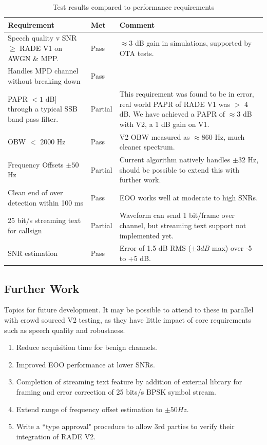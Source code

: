 \documentclass{article}
\begin{document}
\begin{table} [h]
\caption{Test results compared to performance requirements}
\label{tab:conclusion}
\centering
\begin{tabular}{ p{5cm} | p{1cm} | p{5cm}  }
\hline
Requirement & Met & Comment \\
\hline
Speech quality v SNR $\ge$ RADE V1 on AWGN \& MPP. & Pass & $\approx 3$ \si{dB} gain in simulations, supported by OTA tests. \\
Handles MPD channel without breaking down & Pass & \\
PAPR $< 1$ \si{dB}| through a typical SSB band pass filter. & Partial & This requirement was found to be in error, real world PAPR of RADE V1 was $>$ 4 \si{dB}.  We have achieved a PAPR of $\approx 3$ \si{dB} with V2, a 1 \si{dB} gain on V1. \\
OBW $<$ 2000 \si{Hz} & Pass & V2 OBW measured as $\approx 860$ \si{Hz}, much cleaner spectrum. \\ 
Frequency Offsets $\pm 50$ \si{Hz} & Partial & Current algorithm natively handles $\pm 32$ \si{Hz}, should be possible to extend this with further work. \\
Clean end of over detection within 100 ms & Pass & EOO works well at moderate to high SNRs. \\
25 bit/s streaming text for callsign & Partial & Waveform can send 1 bit/frame over channel, but streaming text support not implemented yet. \\
SNR estimation & Pass & Error of 1.5 dB RMS ($\pm 3 \si{dB}$ max) over -5 to +5 \si{dB}. \\
\hline
\end{tabular}
\end{table}

\subsection{Further Work}

Topics for future development. It may be possible to attend to these in parallel with crowd sourced V2 testing, as they have little impact of core requirements such as speech quality and robustness.
\begin{enumerate}
\item Reduce acquisition time for benign channels.
\item Improved EOO performance at lower SNRs.
\item Completion of streaming text feature by addition of external library for framing and error correction of 25 bits/s BPSK symbol stream.
\item Extend range of frequency offset estimation to $\pm 50 \si{Hz}$.
\item Write a ``type approval" procedure to allow 3rd parties to verify their integration of RADE V2.
\end{enumerate}
\end{document}
